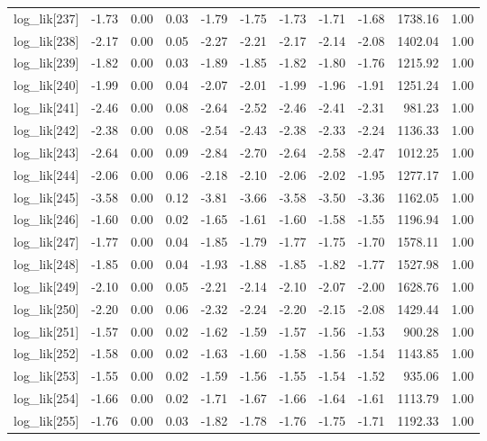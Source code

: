 \begin{table}[ht]
\begin{tabular}{rrrrrrrrrrr}
  log\_lik[237] & -1.73 & 0.00 & 0.03 & -1.79 & -1.75 & -1.73 & -1.71 & -1.68 & 1738.16 & 1.00 \\ 
  log\_lik[238] & -2.17 & 0.00 & 0.05 & -2.27 & -2.21 & -2.17 & -2.14 & -2.08 & 1402.04 & 1.00 \\ 
  log\_lik[239] & -1.82 & 0.00 & 0.03 & -1.89 & -1.85 & -1.82 & -1.80 & -1.76 & 1215.92 & 1.00 \\ 
  log\_lik[240] & -1.99 & 0.00 & 0.04 & -2.07 & -2.01 & -1.99 & -1.96 & -1.91 & 1251.24 & 1.00 \\ 
  log\_lik[241] & -2.46 & 0.00 & 0.08 & -2.64 & -2.52 & -2.46 & -2.41 & -2.31 & 981.23 & 1.00 \\ 
  log\_lik[242] & -2.38 & 0.00 & 0.08 & -2.54 & -2.43 & -2.38 & -2.33 & -2.24 & 1136.33 & 1.00 \\ 
  log\_lik[243] & -2.64 & 0.00 & 0.09 & -2.84 & -2.70 & -2.64 & -2.58 & -2.47 & 1012.25 & 1.00 \\ 
  log\_lik[244] & -2.06 & 0.00 & 0.06 & -2.18 & -2.10 & -2.06 & -2.02 & -1.95 & 1277.17 & 1.00 \\ 
  log\_lik[245] & -3.58 & 0.00 & 0.12 & -3.81 & -3.66 & -3.58 & -3.50 & -3.36 & 1162.05 & 1.00 \\ 
  log\_lik[246] & -1.60 & 0.00 & 0.02 & -1.65 & -1.61 & -1.60 & -1.58 & -1.55 & 1196.94 & 1.00 \\ 
  log\_lik[247] & -1.77 & 0.00 & 0.04 & -1.85 & -1.79 & -1.77 & -1.75 & -1.70 & 1578.11 & 1.00 \\ 
  log\_lik[248] & -1.85 & 0.00 & 0.04 & -1.93 & -1.88 & -1.85 & -1.82 & -1.77 & 1527.98 & 1.00 \\ 
  log\_lik[249] & -2.10 & 0.00 & 0.05 & -2.21 & -2.14 & -2.10 & -2.07 & -2.00 & 1628.76 & 1.00 \\ 
  log\_lik[250] & -2.20 & 0.00 & 0.06 & -2.32 & -2.24 & -2.20 & -2.15 & -2.08 & 1429.44 & 1.00 \\ 
  log\_lik[251] & -1.57 & 0.00 & 0.02 & -1.62 & -1.59 & -1.57 & -1.56 & -1.53 & 900.28 & 1.00 \\ 
  log\_lik[252] & -1.58 & 0.00 & 0.02 & -1.63 & -1.60 & -1.58 & -1.56 & -1.54 & 1143.85 & 1.00 \\ 
  log\_lik[253] & -1.55 & 0.00 & 0.02 & -1.59 & -1.56 & -1.55 & -1.54 & -1.52 & 935.06 & 1.00 \\ 
  log\_lik[254] & -1.66 & 0.00 & 0.02 & -1.71 & -1.67 & -1.66 & -1.64 & -1.61 & 1113.79 & 1.00 \\ 
  log\_lik[255] & -1.76 & 0.00 & 0.03 & -1.82 & -1.78 & -1.76 & -1.75 & -1.71 & 1192.33 & 1.00 \\ 

\end{tabular}
\end{table}
